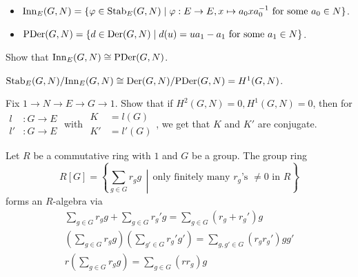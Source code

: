 \begin{definition} \mbox{}
  \begin{itemize}
    \item $\operatorname{Inn}_E(G, N) = \{ \varphi \in \operatorname{Stab}_E(G, N) \mid
      \varphi: E \to E, x \mapsto a_0 x a_0^{-1} \text{~for some~} a_0 \in N \}$.
    \item $\operatorname{PDer}(G, N) = \{ d \in \operatorname{Der}(G, N) \mid
      d(u) = ua_1 - a_1 \text{~for some~} a_1 \in N \}$.
  \end{itemize}
\end{definition}

\begin{exercise}
  Show that $\operatorname{Inn}_E(G, N) \cong \operatorname{PDer}(G, N)$.
\end{exercise}

${\operatorname{Stab}_E(G, N)}/{\operatorname{Inn}_E(G, N)} \cong {\operatorname{Der}(G, N)}/{\operatorname{PDer}(G, N)}
= H^1(G, N)$.

\begin{exercise}
  Fix $1\to N\to E\to G\to 1$. Show that if
  $H^2(G, N) = 0, H^1(G, N) = 0$, then for $\begin{aligned}
    l&:G\to E\\
    l'&:G\to E
  \end{aligned}$ with $\begin{aligned}
    K &= l(G) \\
    K' &= l'(G)
  \end{aligned}$, we get that $K$ and $K'$ are conjugate.
\end{exercise}

\begin{definition}
  Let $R$ be a commutative ring with $1$ and $G$ be a group.
  The group ring 
  \[ R[G] = \left\{ \sum_{g\in G} r_g g \,\middle|\,
    \text{only finitely many $r_g$'s $\ne 0$ in $R$}
  \right\} \]
  forms an $R$-algebra via
  \begin{gather*}
    \sum_{g\in G} r_g g + \sum_{g\in G} r_g' g
    = \sum_{g\in G} (r_g + r_g') g \\
    \left(\sum_{g\in G} r_g g\right)\left( \sum_{g'\in G} r_g' g' \right)
    = \sum_{g, g'\in G} (r_g r_g') g g' \\
    r\left(\sum_{g\in G} r_g g\right) = \sum_{g\in G} (rr_g) g
  \end{gather*}
\end{definition}

